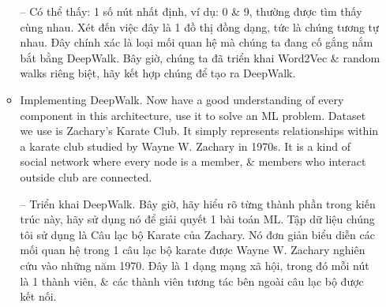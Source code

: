 \documentclass{article}
\begin{document}
\begin{itemize}
\begin{itemize}
        -- Có thể thấy: 1 số nút nhất định, ví dụ: 0 \& 9, thường được tìm thấy cùng nhau. Xét đến việc đây là 1 đồ thị đồng dạng, tức là chúng tương tự nhau. Đây chính xác là loại mối quan hệ mà chúng ta đang cố gắng nắm bắt bằng DeepWalk. Bây giờ, chúng ta đã triển khai Word2Vec \& random walks riêng biệt, hãy kết hợp chúng để tạo ra DeepWalk.
        \item {\sf Implementing DeepWalk.} Now have a good understanding of every component in this architecture, use it to solve an ML problem. Dataset we use is Zachary's Karate Club. It simply represents relationships within a karate club studied by {\sc Wayne W. Zachary} in 1970s. It is a kind of social network where every node is a member, \& members who interact outside club are connected.

        -- {\sf Triển khai DeepWalk.} Bây giờ, hãy hiểu rõ từng thành phần trong kiến trúc này, hãy sử dụng nó để giải quyết 1 bài toán ML. Tập dữ liệu chúng tôi sử dụng là Câu lạc bộ Karate của Zachary. Nó đơn giản biểu diễn các mối quan hệ trong 1 câu lạc bộ karate được {\sc Wayne W. Zachary} nghiên cứu vào những năm 1970. Đây là 1 dạng mạng xã hội, trong đó mỗi nút là 1 thành viên, \& các thành viên tương tác bên ngoài câu lạc bộ được kết nối.


\end{itemize}
\end{itemize}
\end{document}
